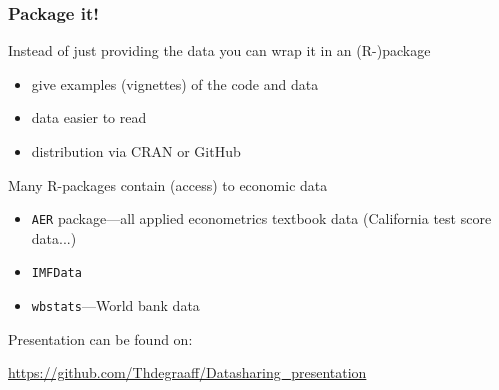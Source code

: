 \documentclass[ignorenonframetext]{beamer}
\begin{document}
\begin{frame}
  \frametitle{Package it!}
  Instead of just providing the data you can wrap it in an \alert{(R-)package}
  \begin{itemize}
    \item give examples (vignettes) of the code and data
    \item data easier to read
    \item distribution via CRAN or \alert{GitHub}\newline
  \end{itemize}
  Many R-packages contain (access) to economic data
  \begin{itemize}
    \item \texttt{AER} package---all applied econometrics textbook data (California test score data...)
    \item \texttt{IMFData}
    \item \texttt{wbstats}---World bank data
  \end{itemize}

\end{frame}

\begin{frame}[standout]
  Presentation can be found on:

  \url{https://github.com/Thdegraaff/Datasharing_presentation}
\end{frame}
\end{document}

